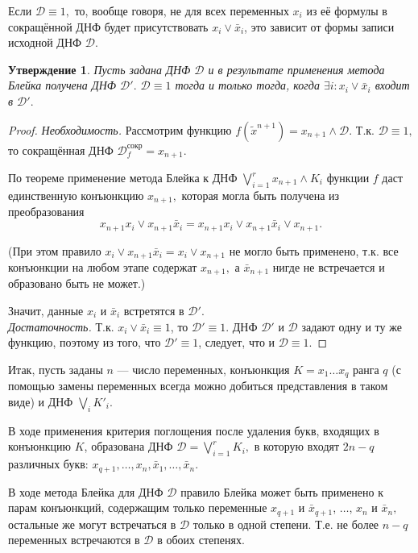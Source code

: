 \documentclass[12pt,a4paper,oneside,fleqn,leqno]{article}
\newtheorem{statement}{Утверждение}
\theoremstyle{definition}
\begin{document}
		Если $\mathcal{D} \equiv 1,$ то, вообще говоря, не для всех переменных $x_i$ из её формулы в сокращённой ДНФ будет присутствовать $x_i \vee \bar{x}_i$, это зависит от формы записи исходной ДНФ $\mathcal{D}.$\par
		\begin{statement}
			Пусть задана ДНФ $\mathcal{D}$ и в результате применения метода Блейка получена ДНФ $\mathcal{D}'.$ $\mathcal{D} \equiv 1$ тогда и только тогда, когда $\exists i: x_i \vee \bar{x}_i$ входит в $\mathcal{D}'.$
		\end{statement}
		\begin{proof}
			\textit{Необходимость.} Рассмотрим функцию $f(\tilde x^{n+1}) = x_{n + 1} \wedge \mathcal{D}.$ Т.к. $\mathcal{D} \equiv 1,$ то сокращённая ДНФ $\mathcal{D}_f^{\text{сокр}} = x_{n + 1}.$\par
			По теореме применение метода Блейка к ДНФ $\bigvee\limits_{i = 1}^r x_{n + 1} \wedge K_i$ функции $f$ даст единственную конъюнкцию $x_{n + 1},$ которая могла быть получена из преобразования
			$$
				x_{n + 1} x_i \vee x_{n + 1} \bar{x}_i = x_{n + 1} x_i \vee x_{n + 1} \bar{x}_i \vee x_{n + 1}.
			$$\par
			(При этом правило $x_i \vee x_{n + 1} \bar{x}_i = x_i \vee x_{n + 1}$ не могло быть применено, т.к. все конъюнкции на любом этапе содержат $x_{n + 1},$ а $\bar{x}_{n + 1}$ нигде не встречается и образовано быть не может.)\par
			Значит, данные $x_i$ и $\bar{x}_i$ встретятся в $\mathcal{D}'.$\\
		\textit{Достаточность.} Т.к. $x_i \vee \bar{x}_i \equiv 1$, то $\mathcal{D}' \equiv 1$. ДНФ $\mathcal{D}'$ и $\mathcal{D}$ задают одну и ту же функцию, поэтому из того, что $\mathcal{D}' \equiv 1$, следует, что и $\mathcal{D} \equiv 1.$
		\end{proof}\par
		Итак, пусть заданы $n$ --- число переменных, конъюнкция $K = x_1\ldots x_q$ ранга $q$ (с помощью замены переменных всегда можно добиться представления в таком виде) и ДНФ $\bigvee\limits_iK'_i.$\par
		В ходе применения критерия поглощения после удаления букв, входящих в конъюнкцию $K$, образована ДНФ $\mathcal{D} = \bigvee\limits_{i = 1}^rK_i,$ в которую входят $2n - q$ различных букв: $x_{q + 1},\ldots, x_n, \bar{x}_1,\ldots,\bar{x}_n$.\par
		В ходе метода Блейка для ДНФ $\mathcal{D}$ правило Блейка может быть применено к парам конъюнкций, содержащим только переменные $x_{q+1}$ и $\bar{x}_{q+1}$, $\ldots$, $x_{n}$ и $\bar{x}_{n},$ остальные же могут встречаться в $\mathcal{D}$ только в одной степени. Т.е. не более $n - q$ переменных встречаются в $\mathcal{D}$ в обоих степенях.\par
\end{document}
